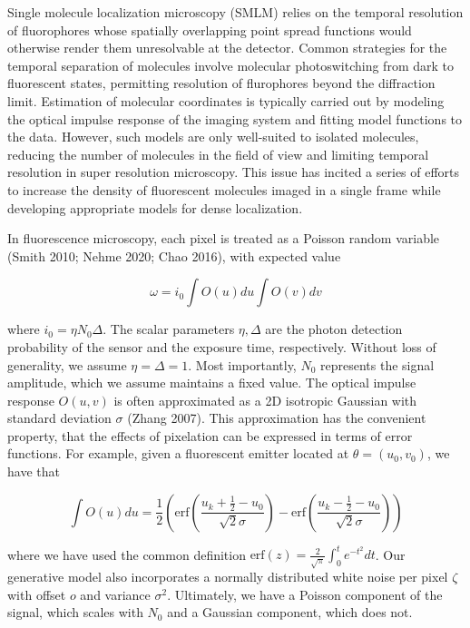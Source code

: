 \documentclass{article}
\begin{document}
Single molecule localization microscopy (SMLM) relies on the temporal resolution of fluorophores whose spatially overlapping point spread functions would otherwise render them unresolvable at the detector. Common strategies for the temporal separation of molecules involve molecular photoswitching from dark to fluorescent states, permitting resolution of flurophores beyond the diffraction limit. Estimation of molecular coordinates is typically carried out by modeling the optical impulse response of the imaging system and fitting model functions to the data. However, such models are only well-suited to isolated molecules, reducing the number of molecules in the field of view and limiting temporal resolution in super resolution microscopy. This issue has incited a series of efforts to increase the density of fluorescent molecules imaged in a single frame while developing appropriate models for dense localization.

In fluorescence microscopy, each pixel is treated as a Poisson random variable (Smith 2010; Nehme 2020; Chao 2016), with expected value

\begin{equation}
\omega = i_{0}\int O(u)du\int O(v)dv
\end{equation}

where $i_{0} = \eta N_{0}\Delta$. The scalar parameters $\eta,\Delta$ are the photon detection probability of the sensor and the exposure time, respectively. Without loss of generality, we assume $\eta = \Delta = 1$. Most importantly, $N_{0}$ represents the signal amplitude, which we assume maintains a fixed value. The optical impulse response $O(u,v)$ is often approximated as a 2D isotropic Gaussian with standard deviation $\sigma$ (Zhang 2007). This approximation has the convenient property, that the effects of pixelation can be expressed in terms of error functions. For example, given a fluorescent emitter located at $\theta = (u_{0},v_{0})$, we have that

\begin{equation}
\int O(u)du = \frac{1}{2}\left(\mathrm{erf}\left(\frac{u_{k}+\frac{1}{2}-u_{0}}{\sqrt{2}\sigma}\right) -\mathrm{erf}\left(\frac{u_{k}-\frac{1}{2}-u_{0}}{\sqrt{2}\sigma}\right)\right)
\end{equation}

where we have used the common definition $\mathrm{erf}(z) = \frac{2}{\sqrt{\pi}}\int_{0}^{t}e^{-t^{2}}dt$. Our generative model also incorporates a normally distributed white noise per pixel $\zeta$ with offset $o$ and variance $\sigma^{2}$. Ultimately, we have a Poisson component of the signal, which scales with $N_{0}$ and a Gaussian component, which does not. 
\end{document}
